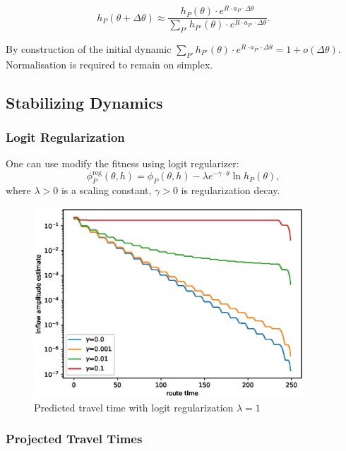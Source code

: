 \documentclass[12pt]{article}
\begin{document}
$$ h_P(\theta + \Delta\theta) \approx \frac{ h_P(\theta) \cdot e^{ R \cdot a_P \cdot \Delta \theta }} { \sum_{P'}  h_{P'}(\theta) \cdot e^{ R \cdot a_{P'} \cdot \Delta\theta } } .$$

By construction of the initial dynamic $\sum_{P'}  h_{P'}(\theta) \cdot e^{ R \cdot a_{P'} \cdot \Delta\theta } = 1 + o(\Delta \theta)$. Normalisation is required to remain on simplex.


\subsection*{Stabilizing Dynamics}

\subsubsection*{Logit Regularization}

One can use modify the fitness using logit regularizer:
$$ \phi^{\text{reg}}_P(\theta, h) = \phi_P(\theta, h) - \lambda e^{-\gamma \cdot \theta} \ln{ h_P(\theta) }, $$
where $\lambda > 0$ is a scaling constant, $\gamma > 0$ is regularization decay.

\begin{figure}
	\includegraphics[width=0.9\textwidth]{img/reg_pred_tt.eps}
	\caption{Predicted travel time with logit regularization $\lambda=1$}
	\label{fig:reg_pred_tt}

\end{figure}

\subsubsection*{Projected Travel Times}
\end{document}
